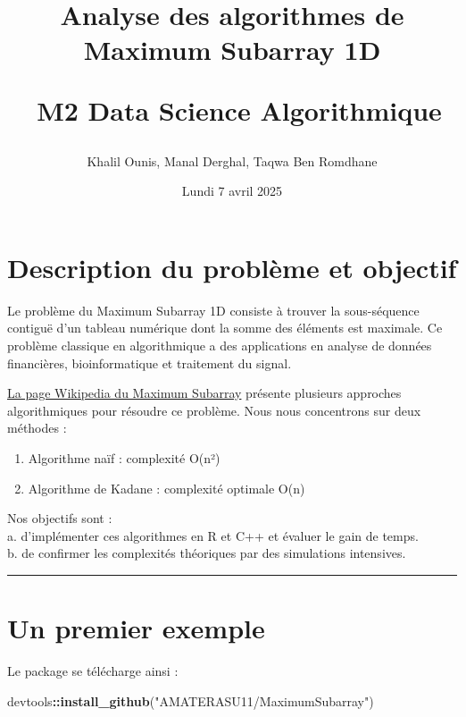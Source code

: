 \documentclass[
]{article}
\title{Analyse des algorithmes de Maximum Subarray 1D\\
\strut ~M2 Data Science Algorithmique}
\author{Khalil Ounis, Manal Derghal, Taqwa Ben Romdhane}
\date{Lundi 7 avril 2025}
\newenvironment{Shaded}{\begin{snugshade}}{\end{snugshade}}
\newcommand{\FunctionTok}[1]{\textcolor[rgb]{0.13,0.29,0.53}{\textbf{#1}}}
\newcommand{\NormalTok}[1]{#1}
\newcommand{\SpecialCharTok}[1]{\textcolor[rgb]{0.81,0.36,0.00}{\textbf{#1}}}
\newcommand{\StringTok}[1]{\textcolor[rgb]{0.31,0.60,0.02}{#1}}
\providecommand{\tightlist}{%
  \setlength{\itemsep}{0pt}\setlength{\parskip}{0pt}}
\begin{document}
\maketitle

{
\hypersetup{linkcolor=}
\setcounter{tocdepth}{2}
\tableofcontents
}
\noindent\hrulefill

\section{Description du problème et
objectif}\label{description-du-probluxe8me-et-objectif}

Le problème du Maximum Subarray 1D consiste à trouver la sous-séquence
contiguë d'un tableau numérique dont la somme des éléments est maximale.
Ce problème classique en algorithmique a des applications en analyse de
données financières, bioinformatique et traitement du signal.

\href{https://en.wikipedia.org/wiki/Maximum_subarray_problem}{La page
Wikipedia du Maximum Subarray} présente plusieurs approches
algorithmiques pour résoudre ce problème. Nous nous concentrons sur deux
méthodes :

\begin{enumerate}
\def\labelenumi{\arabic{enumi}.}
\tightlist
\item
  Algorithme naïf : complexité O(n²)
\item
  Algorithme de Kadane : complexité optimale O(n)
\end{enumerate}

Nos objectifs sont :\\
a. d'implémenter ces algorithmes en R et C++ et évaluer le gain de
temps.\\
b. de confirmer les complexités théoriques par des simulations
intensives.

\begin{center}\rule{0.5\linewidth}{0.5pt}\end{center}

\section{Un premier exemple}\label{un-premier-exemple}

Le package se télécharge ainsi :

\begin{Shaded}
\begin{Highlighting}[]
\NormalTok{devtools}\SpecialCharTok{::}\FunctionTok{install\_github}\NormalTok{(}\StringTok{"AMATERASU11/MaximumSubarray"}\NormalTok{)}
\end{Highlighting}
\end{Shaded}
\end{document}
